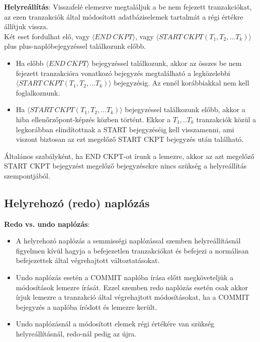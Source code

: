 \documentclass[12pt,margin=0px]{article}
\newcommand\lword[1]{\leavevmode\nobreak\hskip0pt plus\linewidth\penalty50\hskip0pt plus-\linewidth\nobreak #1}
\begin{document}
	\noindent \textbf{Helyreállítás}: Visszafelé elemezve megtaláljuk a be nem fejezett tranzakciókat, az ezen tranzakciók által
	módosított adatbáziselemek tartalmát a régi értékre állítjuk vissza. \\
    Két eset fordulhat elő, vagy $\langle END \ CKPT \rangle$, vagy
	$\langle START \ CKPT(T_{1},T_{2},...T_{k}) \rangle$ \lword{naplóbejegyzéssel} találkozunk előbb.
	
	\begin{itemize}
		\item	Ha előbb $\langle END \ CKPT \rangle$ bejegyzéssel találkozunk, akkor az összes be nem fejezett tranzakcióra
		vonatkozó bejegyzés megtalálható a legközelebbi \\ $\langle START \ CKPT(T_{1},T_{2},...T_{k}) \rangle$ bejegyzésig. Az ennél korábbiakkal nem kell foglalkoznunk.
		\item	Ha $\langle START \ CKPT(T_{1},T_{2},...T_{k}) \rangle$ bejegyzéssel találkozunk előbb, akkor a hiba
		ellenőrzőpont-képzés közben történt. Ekkor a $T_{1},..T_{k}$ tranzakciók közül a legkorábban elindítottnak
		a START bejegyzéséig kell visszamenni, ami viszont biztosan az ezt megelőző START CKPT bejegyzés után található.
	\end{itemize}
	
	\noindent Általános szabályként, ha END CKPT-ot írunk a lemezre, akkor az azt megelőző START CKPT bejegyzést megelőző bejegyzésekre nincs szükség a helyreállítás szempontjából.
	
	\subsection*{Helyrehozó (redo) naplózás}
	
	\noindent \textbf{Redo vs. undo naplózás}:
	\begin{itemize}
        \small
		\item	A helyrehozó naplózás a semmisségi naplózással szemben helyreállításnál figyelmen kívül hagyja a befejezetlen
		tranzakciókat és befejezi a normálisan befejezettek által végrehajtott változtatásokat.
		
		\item	Undo naplózás esetén a COMMIT naplóba írása előtt megköveteljük a módosítások lemezre írását. Ezzel szemben
		redo naplózás esetén csak akkor írjuk lemezre a tranzakció által végrehajtott módosításokat, ha a COMMIT bejegyzés
		a naplóba íródott és lemezre került.
		
		\item	Undo naplózásnál a módosított elemek régi értékére van szükség helyreállításnál, redo-nál pedig az újra.
	\end{itemize}
	
\end{document}
